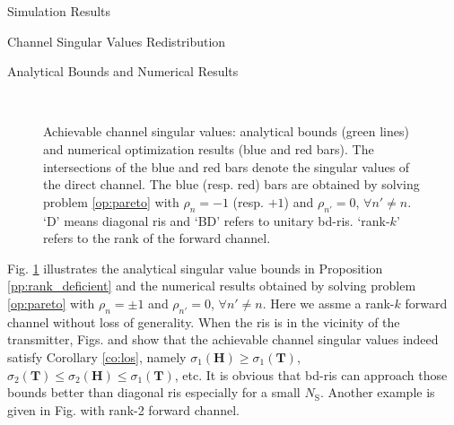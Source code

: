 \documentclass[journal]{IEEEtran}
\begin{document}
\begin{section}{Simulation Results}
\begin{subsection}{Channel Singular Values Redistribution}
		\begin{subsubsection}{Analytical Bounds and Numerical Results}
			\begin{figure}[!t]
				\centering
				\\
				\caption{
					Achievable channel singular values: analytical bounds (green lines) and numerical optimization results (blue and red bars).
					The intersections of the blue and red bars denote the singular values of the direct channel.
					The blue (resp. red) bars are obtained by solving problem \eqref{op:pareto} with $\rho_n = -1$ (resp. $+1$) and $\rho_{n'} = 0$, $\forall n' \ne n$.
					`D' means diagonal \gls{ris} and `BD' refers to unitary \gls{bd}-\gls{ris}.
					`rank-$k$' refers to the rank of the forward channel.
				}
				\label{fg:singular_bound}
			\end{figure}
			Fig. \ref{fg:singular_bound} illustrates the analytical singular value bounds in Proposition \ref{pp:rank_deficient} and the numerical results obtained by solving problem \eqref{op:pareto} with $\rho_n = \pm 1$ and $\rho_{n'} = 0$, $\forall n' \ne n$.
			Here we assme a rank-$k$ forward channel without loss of generality.
			When the \gls{ris} is in the vicinity of the transmitter, Figs.  and  show that the achievable channel singular values indeed satisfy Corollary \ref{co:los}, namely $\sigma_1(\mathbf{H}) \ge \sigma_1(\mathbf{T})$, $\sigma_2(\mathbf{T}) \le \sigma_2(\mathbf{H}) \le \sigma_1(\mathbf{T})$, etc.
			It is obvious that \gls{bd}-\gls{ris} can approach those bounds better than diagonal \gls{ris} especially for a small $N_\mathrm{S}$.
			Another example is given in Fig.  with rank-2 forward channel.

\end{subsubsection}
\end{subsection}
\end{section}
\end{document}
